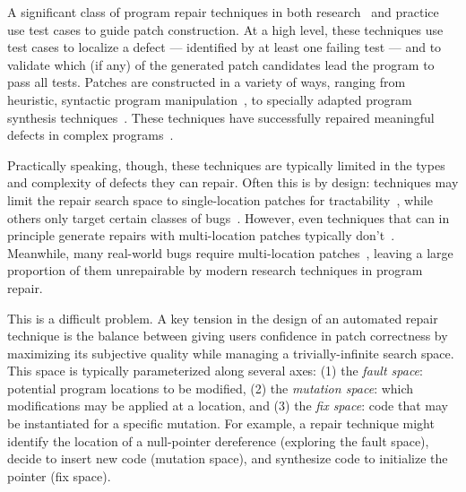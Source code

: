 \documentclass[10pt, conference]{IEEEtran}
\begin{document}
A significant class of program repair techniques in both
research~\cite{genprog,angelix,Le17,Xuan17,arja-journal,prapr,saha2019harnessing,astor}
and practice~\cite{sapfix} use test
cases to guide patch construction. At a high level, these techniques use test cases
to localize a defect --- identified by at least one failing test --- and to
validate which (if any) of the generated patch candidates lead
the program to pass all tests.
Patches are constructed in a variety of ways, ranging from heuristic, syntactic
program manipulation~\cite{par,genprog,rsrepair,ae,prophet,hdrepair,arja-journal,confix,saha2019harnessing},
to specially adapted program synthesis 
techniques~\cite{Konighofer11,Konighofer12,semfix,DeMarco14,angelix,sosrepair,Xuan17}. 
These techniques have successfully
repaired meaningful defects in complex
programs~\cite{angelix,genprog-eight-dollars,sapfix,durieux-repair-them-all}.

Practically speaking, though, these techniques are typically limited in the types and
complexity of defects they can repair. Often this is by design: techniques may
limit the repair search space to single-location patches for
tractability~\cite{rsrepair,ae,hdrepair,capgen}, while others only target certain
classes of bugs~\cite{Xuan17,sapfix,DeMarco14,par}. However, even techniques
that can in principle generate repairs with multi-location patches typically
don't~\cite{patch-correctness}.
%
Meanwhile, many real-world bugs require multi-location 
patches~\cite{d4j-dissection,zhong2015}, leaving a large
proportion of them unrepairable by modern
research techniques in program repair.  

This is a difficult problem.
A key tension in the design of an automated repair technique is the balance
between giving users confidence in patch correctness by maximizing its
subjective quality while managing a trivially-infinite search space. This space
is typically parameterized along several axes: (1) the \emph{fault space}:
potential program locations to be modified, (2) the \emph{mutation space}: which
modifications may be applied at a location, and (3) the \emph{fix space}: code
that may be instantiated for a specific mutation. For example, a repair
technique might identify the location of a null-pointer dereference (exploring
the fault space), decide to insert new code (mutation space), and synthesize
code to initialize the pointer (fix space). 
\end{document}
